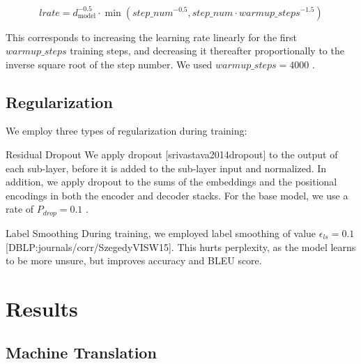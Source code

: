 \documentclass[11pt,a4paper]{article}
\begin{document}
$$\begin{equation}
lrate = d_{\text{model}}^{-0.5} \cdot
  \min({step\_num}^{-0.5},
    {step\_num} \cdot {warmup\_steps}^{-1.5})
\end{equation}$$

This corresponds to increasing the learning rate linearly for the first  $warmup\_steps$  training steps, and decreasing it thereafter proportionally to the inverse square root of the step number.  We used  $warmup\_steps=4000$ .

\subsection{Regularization}

We employ three types of regularization during training:

Residual Dropout We apply dropout [srivastava2014dropout] to the output of each sub-layer, before it is added to the sub-layer input and normalized.   In addition, we apply dropout to the sums of the embeddings and the positional encodings in both the encoder and decoder stacks.  For the base model, we use a rate of  $P_{drop}=0.1$ .

Label Smoothing During training, we employed label smoothing of value  $\epsilon_{ls}=0.1$  [DBLP:journals/corr/SzegedyVISW15].  This hurts perplexity, as the model learns to be more unsure, but improves accuracy and BLEU score.

\section{Results}

\subsection{Machine Translation}
\end{document}
